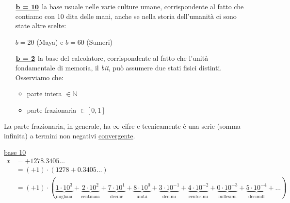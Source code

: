 \begin{itemize}
	\item[$\uline{\textbf{b = 10}}$] la base usuale nelle varie culture umane, corrispondente al fatto che contiamo con 10 dita delle mani, anche se nella storia dell'umanità ci sono state altre scelte:
	\begin{esempio}
	$b = 20$ (Maya) e $b = 60$ (Sumeri)
	\end{esempio}
	\item[$\uline{\textbf{b = 2}}$] la base del calcolatore, corrispondente al fatto che l'unità fondamentale di memoria, il \textit{bit}, può assumere due stati fisici distinti. \\
	Osserviamo che:
	\begin{itemize}
	    \item parte intera $\in \mathbb{N}$
	    \item parte frazionaria $\in [0,1]$
	\end{itemize}
\end{itemize}
La parte frazionaria, in generale, ha $\infty$ cifre e tecnicamente è una serie (somma infinita) a termini non negativi \uline{convergente}.
\begin{esempio}
\uline{base 10}
\[ \begin{split}
    x & = +1278.3405 \dotsc \\
    & = (+1) \cdot (1278 + 0.3405 \dotsc) \\
    & = (+1) \cdot ( \underbrace{1 \cdot 10^3}_{\text {migliaia}} + %
    \underbrace{2 \cdot 10^2}_{\text {centinaia}} + %
    \underbrace{7 \cdot 10^1}_{\text {decine}} + %
    \underbrace{8 \cdot 10^0}_{\text {unità}} + %
    \underbrace{3 \cdot 10^{-1}}_{\text {decimi}} + %
    \underbrace{4 \cdot 10^{-2}}_{\text {centesimi}} + %
    \underbrace{0 \cdot 10^{-3}}_{\text {millesimi}} + %
    \underbrace{5 \cdot 10^{-4}}_{\text {decimill}} + \dotsc) 
\end{split} \]
\end{esempio}

